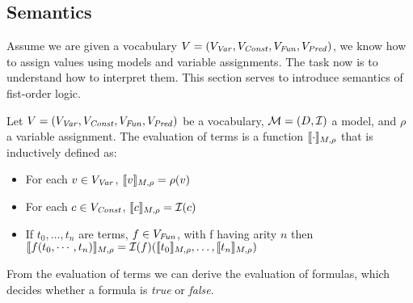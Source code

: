 \subsection{Semantics}
Assume we are given a vocabulary $V = (V_{\mathit{Var}}, V_{\mathit{Const}}, V_{\mathit{Fun}}, V_{\mathit{Pred}})$, we know how to assign values using models and variable assignments. The task now is to understand how to interpret them. This section serves to introduce semantics of fist-order logic.
\begin{mydef}
	Let $V = (V_{\mathit{Var}}, V_{\mathit{Const}}, V_{\mathit{Fun}}, V_{\mathit{Pred}})$ be a vocabulary, $\mathcal{M} = (D, \mathcal{I})$ a model, and $\rho$ a variable assignment. The evaluation of terms is a function $\llbracket \cdot \rrbracket_{M, \rho}$ that is inductively defined as:
	\begin{itemize}
		\item For each $v \in V_{\mathit{Var}}$, $\llbracket v \rrbracket_{M, \rho} = \rho(v)$
		\item For each $c \in V_{\mathit{Const}}$, $\llbracket c \rrbracket_{M, \rho} = \mathcal{I}(c)$
		\item If $t_0, \ldots, t_n$ are terms, $f \in V_{\mathit{Fun}}$, with f having arity $n$ then \\ $\llbracket f(t_0, \cdots, t_n) \rrbracket_{M, \rho} = \mathcal{I}(f)(\llbracket t_0 \rrbracket_{M, \rho}, \ldots, \llbracket t_n \rrbracket_{M, \rho})$
	\end{itemize}
\end{mydef}
From the evaluation of terms we can derive the evaluation of formulas, which decides whether a formula is \textsl{true} or \textsl{false}.

